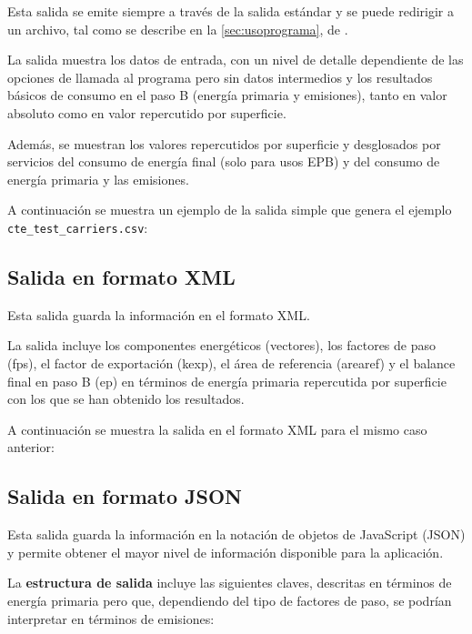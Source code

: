 \documentclass[10pt,notitlepage,oneside,a4paper]{article}
\begin{document}
Esta salida se emite siempre a través de la salida estándar y se puede redirigir a un archivo, tal como se describe en la \autoref{sec:usoprograma}, de .

La salida muestra los datos de entrada, con un nivel de detalle dependiente de las opciones de llamada al programa pero sin datos intermedios y los resultados básicos de consumo en el paso B (energía primaria y emisiones), tanto en valor absoluto como en valor repercutido por superficie.

Además, se muestran los valores repercutidos por superficie y desglosados por servicios del consumo de energía final (solo para usos EPB) y del consumo de energía primaria y las emisiones.

A continuación se muestra un ejemplo de la salida simple que genera el ejemplo \texttt{cte\_test\_carriers.csv}:



\newpage
\subsection{Salida en formato XML}
\label{subsec:formatoxml}

Esta salida guarda la información en el formato XML.

La salida incluye los componentes energéticos (vectores), los factores de paso (fps), el factor de exportación (kexp), el área de referencia (arearef) y el balance final en paso B (ep) en términos de energía primaria repercutida por superficie  con los que se han obtenido los resultados.

A continuación se muestra la salida en el formato XML para el mismo caso anterior:



\newpage
\subsection{Salida en formato JSON}
\label{subsec:formatojson}

Esta salida guarda la información en la notación de objetos de JavaScript (JSON) y permite obtener el mayor nivel de información disponible para la aplicación.

La \textbf{estructura de salida} incluye las siguientes claves, descritas en términos de energía primaria pero que, dependiendo del tipo de factores de paso, se podrían interpretar en términos de emisiones:
\end{document}
